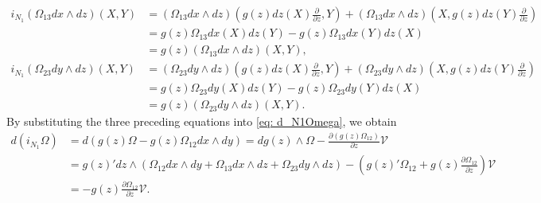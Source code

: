 \documentclass[12pt]{article}
\begin{document}
\begin{align*}
i_{N_1}(\Omega_{13}dx\wedge dz)(X,Y)%
&=(\Omega_{13}dx\wedge dz)\left(g(z)dz(X)\frac{\partial}{\partial z},Y\right)+(\Omega_{13}dx\wedge dz)\left(X,g(z)dz(Y)\frac{\partial}{\partial z}\right)\\
&=g(z)\Omega_{13}dx(X)dz(Y)-g(z)\Omega_{13}dx(Y)dz(X)\\
&=g(z)(\Omega_{13}dx\wedge dz)(X,Y),\\
i_{N_1}(\Omega_{23}dy\wedge dz)(X,Y)%
&=(\Omega_{23}dy\wedge dz)\left(g(z)dz(X)\frac{\partial}{\partial z},Y\right)+(\Omega_{23}dy\wedge dz)\left(X,g(z)dz(Y)\frac{\partial}{\partial z}\right)\\
&=g(z)\Omega_{23}dy(X)dz(Y)-g(z)\Omega_{23}dy(Y)dz(X)\\
&=g(z)(\Omega_{23}dy\wedge dz)(X,Y).
\end{align*}
By substituting the three preceding equations into \eqref{eq: d_N1Omega}, we obtain
\begin{align*}
d(i_{N_1}\Omega)&=d(g(z)\Omega-g(z)\Omega_{12}dx\wedge dy)=dg(z)\wedge \Omega-\frac{\partial \left(g(z)\Omega_{12}\right)}{\partial z}\mathcal V\\
&=g(z)'dz\wedge (\Omega_{12}dx\wedge dy+\Omega_{13}dx\wedge dz+\Omega_{23}dy\wedge dz)-\left(g(z)'\Omega_{12}+g(z)\frac{\partial \Omega_{12}}{\partial z}\right)\mathcal V\\
&=-g(z)\frac{\partial \Omega_{12}}{\partial z}\mathcal V.
\end{align*}
\end{document}
